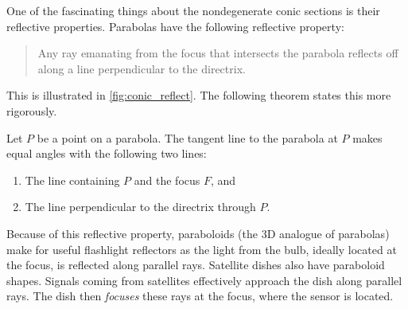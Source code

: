 {One of the fascinating things about the nondegenerate conic sections is their reflective properties. Parabolas have the following reflective property:

\begin{quote}
	Any ray emanating from the focus that intersects the parabola reflects off along a line perpendicular to the directrix.
\end{quote}

This is illustrated in \autoref{fig:conic_reflect}. The following theorem states this more rigorously.

	
{Let $P$ be a point on a parabola. The tangent line to the parabola at $P$ makes equal angles with the following two lines:
\begin{enumerate}
	\item	The line containing $P$ and the focus $F$, and
	\item	The line perpendicular to the directrix through $P$.
\end{enumerate}}


Because of this reflective property, paraboloids (the 3D analogue of parabolas) make for useful flashlight reflectors as the light from the bulb, ideally located at the focus, is reflected along parallel rays. Satellite dishes also have paraboloid shapes. Signals coming from satellites effectively approach the dish along parallel rays. The dish then \textit{focuses} these rays at the focus, where the sensor is located.
}

